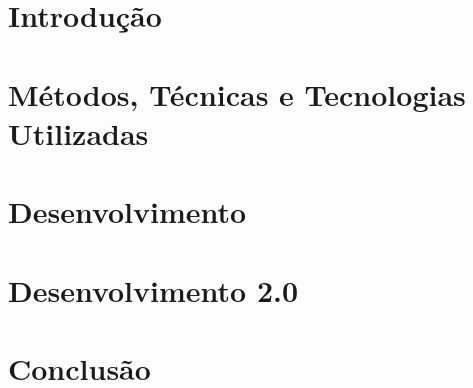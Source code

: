 \documentclass[brazil]{packages/icmc}
\begin{document}

\chapter{Introdução}
\label{chapter:introducao}



\chapter{Métodos, Técnicas e Tecnologias Utilizadas}
\label{chapter:metodos}


\chapter{Desenvolvimento}
\label{chapter:desenvolvimento}


\chapter{Desenvolvimento 2.0}
\label{chapter:desenvolvimento2}


\chapter{Conclusão}
\label{chapter:conclusao}


% 

% 

% 

% 
\end{document}
